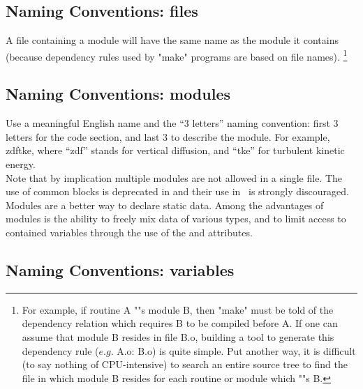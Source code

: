 \subsection{Naming Conventions: files}

A file containing a module will have the same name as the module it contains
(because dependency rules used by "make" programs are based on file names).
\footnote{
  For example, if routine A ""s module B, then "make" must be told of the dependency relation which
  requires B to be compiled before A.
  If one can assume that module B resides in file B.o,
  building a tool to generate this dependency rule ($e.g.$ A.o: B.o) is quite simple.
  Put another way, it is difficult (to say nothing of CPU-intensive) to search an entire source tree to
  find the file in which module B resides for each routine or module which ""s B.
}

\subsection{Naming Conventions: modules}

Use a meaningful English name and the ``3 letters'' naming convention:
first 3 letters for the code section, and last 3 to describe the module.
For example, zdftke, where ``zdf'' stands for vertical diffusion, and ``tke'' for turbulent kinetic energy. \\
Note that by implication multiple modules are not allowed in a single file.
The use of common blocks is deprecated in  and their use in \NEMO\ is strongly discouraged.
Modules are a better way to declare static data.
Among the advantages of modules is the ability to freely mix data of various types, and
to limit access to contained variables through the use of the  and  attributes.

\subsection{Naming Conventions: variables}

